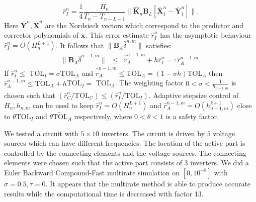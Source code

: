\documentclass{report}
\begin{document}
\begin{equation}
\hat{r}_I^{n} = \frac{1}{4}\frac{H_n}{T_n - T_{n-L-1}}
\|\hat{\mathbf{K}}_{n}\mathbf{B}_L\left[\bar{\mathbf{X}}_{1}^n-\bar{\mathbf{Y}}_{1}^n\right]
\|.
\end{equation}
Here $\bar{\mathbf{Y}}^n,\bar{\mathbf{X}}^n$ are the Nordsieck vectors
which correspond to the predictor and corrector polynomials of $\mathbf{x}$.
This error estimate $\hat{r}_I^n$ has the asymptotic behaviour
$\hat{r}_I^{n} = O(H_n^{L+1})$.
It follows that
$\|\mathbf{B}_A\hat{\delta}^{n,m}\|$ satisfies:
\begin{equation}\begin{array}{rcl}
\|\mathbf{B}_A\hat{\delta}^{n-1,m}\| &\leq& \hat{\tilde{r}}_A^{n-1,m} +
h\hat{r}_I^{n} =: \hat{r}_A^{n-1,m}.
\end{array}\end{equation}
If $\hat{r}_I^{n} \leq $ TOL$_I = \sigma$TOL$_A$ and
$\hat{\tilde{r}}_A^{n-1,m} \leq \tilde{\mbox{TOL}}_A = (1-\sigma h)$TOL$_A$
then $\hat{r}_A^{n-1,m} \leq \tilde{\mbox{TOL}}_A + h$TOL$_I =$ TOL$_A$.
The weighting factor
$0 < \sigma < \frac{1}{h_{n-1,m}}$ is chosen such that
$(\hat r_C^n/\mbox{TOL}_C) \leq (\hat{r}_I^{n}/\mbox{TOL}_I)$.
Adaptive stepsize control of $H_n,h_{n,m}$ can be used to keep
$\hat{r}_I^{n}=O(H_n^{L+1})$ and $\hat{r}_A^{n-1,m}= O(h_{n-1,m}^{k+1})$
close to
$\theta \mbox{TOL}_I$ and $\theta \tilde{\mbox{TOL}}_A$ respectively,
where $0<\theta<1$ is a safety factor.

We tested a circuit with $5 \times 10$ inverters. The circuit is driven
by $5$ voltage sources which can have
different frequencies. The location of the active part is controlled by the connecting
elements and the voltage sources. The connecting elements were chosen such that
the active part consists of 3 inverters.
We did a Euler Backward Compound-Fast multirate simulation on
$[0,10^{-8}]$ with $\sigma = 0.5,\tau = 0$.
It appears that the multirate method is able to produce accurate results
while the computational time
is decreased with factor 13.
\end{document}
